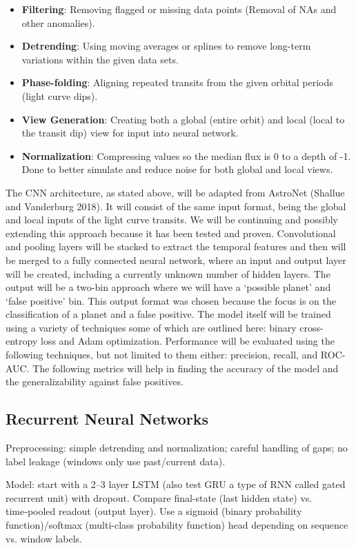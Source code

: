 \documentclass[letterpaper]{article} %
\begin{document}
\begin{itemize}
    \item \textbf{Filtering}: Removing flagged or missing data points (Removal of NAs and other anomalies).
    \item \textbf{Detrending}: Using moving averages or splines to remove long-term variations within the given data sets.
    \item \textbf{Phase-folding}: Aligning repeated transits from the given orbital periods (light curve dips).
    \item \textbf{View Generation}: Creating both a global (entire orbit) and local (local to the transit dip) view for input into neural network.
    \item \textbf{Normalization}: Compressing values so the median flux is 0 to a depth of -1. Done to better simulate and reduce noise for both global and local views.
\end{itemize}

The CNN architecture, as stated above, will be adapted from AstroNet (Shallue and Vanderburg 2018). It will consist of the same input format, being the global and local inputs of the light curve transits. We will be continuing and possibly extending this approach because it has been tested and proven. Convolutional and pooling layers will be stacked to extract the temporal features and then will be merged to a fully connected neural network, where an input and output layer will be created, including a currently unknown number of hidden layers. The output will be a two-bin approach where we will have a `possible planet' and `false positive' bin. This output format was chosen because the focus is on the classification of a planet and a false positive. The model itself will be trained using a variety of techniques some of which are outlined here: binary cross-entropy loss and Adam optimization. Performance will be evaluated using the following techniques, but not limited to them either: precision, recall, and ROC-AUC. The following metrics will help in finding the accuracy of the model and the generalizability against false positives.

\subsection{Recurrent Neural Networks}
Preprocessing: simple detrending and normalization; careful handling of gaps; no label leakage (windows only use past/current data).

Model: start with a 2–3 layer LSTM (also test GRU a type of RNN called gated recurrent unit) with dropout. Compare final-state (last hidden state) vs. time‑pooled readout (output layer). Use a sigmoid (binary probability function)/softmax (multi-class probability function) head depending on sequence vs. window labels.
\end{document}
